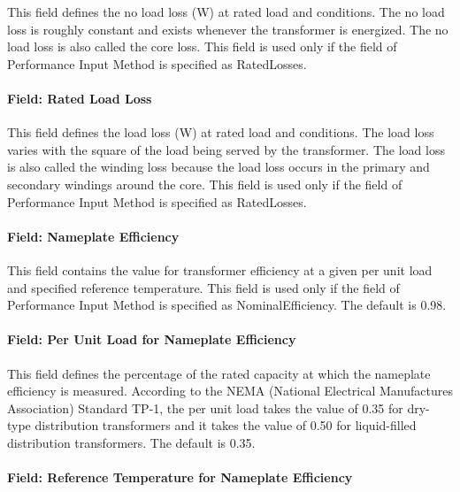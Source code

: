 This field defines the no load loss (W) at rated load and conditions. The no load loss is roughly constant and exists whenever the transformer is energized. The no load loss is also called the core loss. This field is used only if the field of Performance Input Method is specified as RatedLosses.

\paragraph{Field: Rated Load Loss}\label{field-rated-load-loss}

This field defines the load loss (W) at rated load and conditions. The load loss varies with the square of the load being served by the transformer. The load loss is also called the winding loss because the load loss occurs in the primary and secondary windings around the core. This field is used only if the field of Performance Input Method is specified as RatedLosses.

\paragraph{Field: Nameplate Efficiency}\label{field-nameplate-efficiency}

This field contains the value for transformer efficiency at a given per unit load and specified reference temperature. This field is used only if the field of Performance Input Method is specified as NominalEfficiency. The default is 0.98.

\paragraph{Field: Per Unit Load for Nameplate Efficiency}\label{field-per-unit-load-for-nameplate-efficiency}

This field defines the percentage of the rated capacity at which the nameplate efficiency is measured. According to the NEMA (National Electrical Manufactures Association) Standard TP-1, the per unit load takes the value of 0.35 for dry-type distribution transformers and it takes the value of 0.50 for liquid-filled distribution transformers. The default is 0.35.

\paragraph{Field: Reference Temperature for Nameplate Efficiency}\label{field-reference-temperature-for-nameplate-efficiency}

